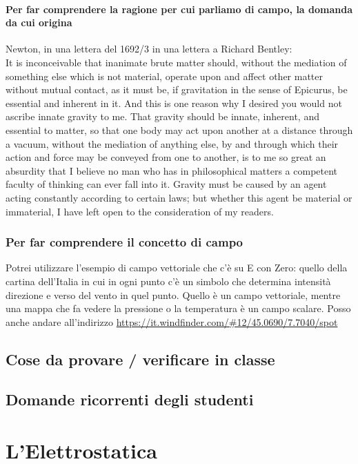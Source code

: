 \documentclass[11pt]{report}
\begin{document}
 \subsubsection*{Per far comprendere la ragione per cui parliamo di campo, la domanda da cui origina}
 Newton, in una lettera del 1692/3 in una lettera a Richard Bentley:\\
 It is inconceivable that inanimate brute matter should, without the mediation of something else which is not material, operate upon and affect other matter without mutual contact, as it must be, if gravitation in the sense of Epicurus, be essential and inherent in it. And this is one reason why I desired you would not ascribe innate gravity to me. That gravity should be innate, inherent, and essential to matter, so that one body may act upon another at a distance through a vacuum, without the mediation of anything else, by and through which their action and force may be conveyed from one to another, is to me so great an absurdity that I believe no man who has in philosophical matters a competent faculty of thinking can ever fall into it. Gravity must be caused by an agent acting constantly according to certain laws; but whether this agent be material or immaterial, I have left open to the consideration of my readers. 

 \subsection*{Per far comprendere il concetto di campo} 
 Potrei utilizzare l'esempio di campo vettoriale che c'è su E con Zero: quello della cartina dell'Italia in cui in ogni punto c'è un simbolo che determina intensità direzione e verso del vento in quel punto. Quello è un campo vettoriale, mentre una mappa che fa vedere la pressione o la temperatura è un campo scalare.
Posso anche andare all'indirizzo \url{https://it.windfinder.com/#12/45.0690/7.7040/spot}


\section*{Cose da provare / verificare in classe}

\section*{Domande ricorrenti degli studenti}

\chapter{L'Elettrostatica}
\end{document}
